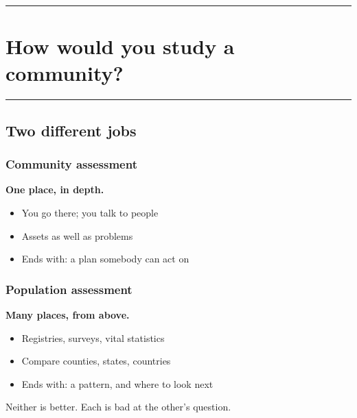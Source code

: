 \documentclass[
  letterpaper,
  DIV=11,
  numbers=noendperiod]{scrartcl}
\providecommand{\tightlist}{%
  \setlength{\itemsep}{0pt}\setlength{\parskip}{0pt}}
\begin{document}
\begin{center}\rule{0.5\linewidth}{0.5pt}\end{center}

\section{\texorpdfstring{{\textbf{How would you study a
community?}}}{How would you study a community?}}\label{how-would-you-study-a-community}

\begin{center}\rule{0.5\linewidth}{0.5pt}\end{center}

\subsection{\texorpdfstring{{\textbf{Two different
jobs}}}{Two different jobs}}\label{two-different-jobs}

\subsubsection{Community assessment}\label{community-assessment}

\textbf{One place, in depth.}

\begin{itemize}
\tightlist
\item
  You go there; you talk to people
\item
  Assets as well as problems
\item
  Ends with: a plan somebody can act on
\end{itemize}

\subsubsection{Population assessment}\label{population-assessment}

\textbf{Many places, from above.}

\begin{itemize}
\tightlist
\item
  Registries, surveys, vital statistics
\item
  Compare counties, states, countries
\item
  Ends with: a pattern, and where to look next
\end{itemize}

Neither is better. Each is bad at the other's question.
\end{document}
